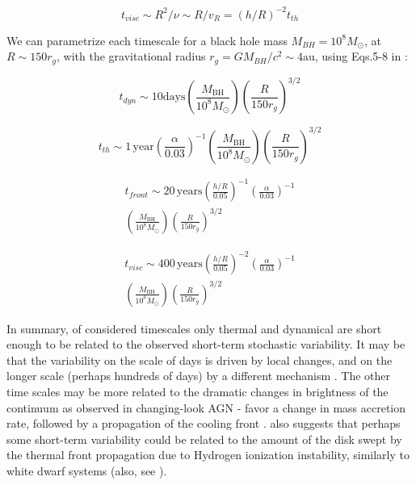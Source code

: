 \documentclass[twocolumn]{aastex62}
\begin{document}
\begin{equation}
t_{visc} {\sim} R^{2} / \nu {\sim}  R / v_{R} = (h/R)^{-2} t_{th}
\end{equation}

 We can parametrize each timescale for a black hole mass $M_{BH} = 10^{8} M_{\odot}$, at $R {\sim} 150 r_{g}$, with the gravitational radius $r_{g} = GM_{BH} / c^{2} {\sim} 4 \mathrm{au}$, using Eqs.5-8 in \cite{stern2018} : 


 \begin{equation}
 t_{dyn} {\sim} 10  \mathrm{days} \left(\frac{M_{\mathrm{BH}}}{10^{8} M_{\odot}} \right) 
 \left( \frac{R}{150 r_{g}}\right) ^{3/2} 
 \end{equation}

 \begin{equation}
 t_{th}   {\sim} 1 \,\mathrm{year} \left( \frac{\alpha}{0.03}\right)^{-1}  
 \left( \frac{M_{\mathrm{BH}}}{10^{8} M_{\odot}}\right) \left( \frac{R}{150 r_{g}}\right)^{3/2} 
 \end{equation}

  \begin{eqnarray}
  t_{front} {\sim} 20 \,\mathrm{years} \left( \frac{h/R}{0.05}\right)^{-1}   \left( \frac{\alpha}{0.03}\right)^{-1}  \nonumber  \\ 
  \left( \frac{M_{\mathrm{BH}}}{10^{8} M_{\odot}}\right)     \left( \frac{R}{150 r_{g}}\right) ^{3/2} 
 \end{eqnarray}

  \begin{eqnarray}
  t_{visc}  {\sim} 400 \, \mathrm{years} \left( \frac{h/R}{0.05}\right)^{-2}   \left( \frac{\alpha}{0.03}\right)^{-1} \nonumber  \\  
  \left(\frac{M_{\mathrm{BH}}}{10^{8} M_{\odot}} \right)     \left( \frac{R}{150 r_{g}}\right) ^{3/2}  
 \end{eqnarray}


In summary,  of   considered timescales only thermal and dynamical are short enough to be related to  the observed short-term stochastic variability. It may be that the variability on the scale of days is driven by local changes, and on the longer scale (perhaps hundreds of days) by a different mechanism \citep{kokubo2015}. The other time scales may be more related to the dramatic changes in brightness of the continuum as observed in changing-look AGN - \citet{noda2018} favor a change in mass accretion rate, followed by a propagation of the cooling front \cite{lawrence2018, simm2016}. \citet{noda2018} also suggests that perhaps some short-term variability could be related to the amount of the disk swept by the thermal front propagation due to Hydrogen ionization instability, similarly to white dwarf systems (also, see \citealt{ruan2019, ross2018, sniegowska2019}). 
\end{document}
